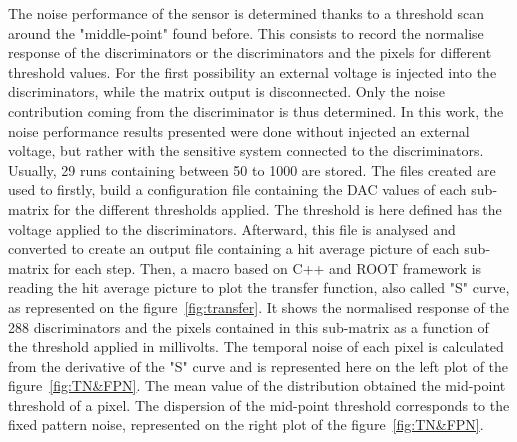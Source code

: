   The noise performance of the sensor is determined thanks to a threshold scan around the "middle-point" found before.
  This consists to record the normalise response of the discriminators or the discriminators and the pixels for different threshold values.
  For the first possibility an external voltage is injected into the discriminators, while the matrix output is disconnected.
  Only the noise contribution coming from the discriminator is thus determined.
  In this work, the noise performance results presented were done without injected an external voltage, but rather with the sensitive system connected to the discriminators.
  Usually, 29 runs containing between 50 to 1000 are stored.
  The files created are used to firstly, build a configuration file containing the DAC values of each sub-matrix for the different thresholds applied.
  The threshold is here defined has the voltage applied to the discriminators.
  Afterward, this file is analysed and converted to create an output file containing a hit average picture of each sub-matrix for each step.
  Then, a macro based on C++ and ROOT framework is reading the hit average picture to plot the transfer function, also called "S" curve, as represented on the figure~\ref{fig:transfer}.
  It shows the normalised response of the 288 discriminators and the pixels contained in this sub-matrix as a function of the threshold applied in millivolts.
  The temporal noise of each pixel is calculated from the derivative of the "S" curve and is represented here on the left plot of the figure~\ref{fig:TN&FPN}.
  The mean value of the distribution obtained the mid-point threshold of a pixel.
  The dispersion of the mid-point threshold corresponds to the fixed pattern noise, represented on the right plot of the figure~\ref{fig:TN&FPN}.
  

